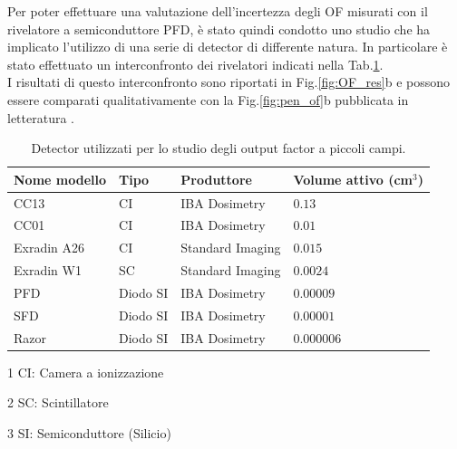 Per poter effettuare una valutazione dell'incertezza degli OF misurati con il rivelatore a semiconduttore PFD, è stato quindi condotto uno studio che ha implicato l'utilizzo di una serie di detector di differente natura. In particolare è stato effettuato un interconfronto dei rivelatori indicati nella Tab.\ref{tab:OF_inter}.\\ I risultati di questo interconfronto sono riportati in Fig.\ref{fig:OF_res}b e possono essere comparati qualitativamente con la Fig.\ref{fig:pen_of}b pubblicata in letteratura \cite{Das2008}.
\begin{table}
\centering
{}
\begin{threeparttable}
\begin{tabular}{llll}
\toprule
Nome modello & Tipo & Produttore & Volume attivo (cm$^3$)\\
\midrule
CC13 & CI\tnote{1} & IBA Dosimetry & $0.13$\\
CC01 & CI & IBA Dosimetry & $0.01$\\
Exradin A26 & CI & Standard Imaging & $0.015$ \\
Exradin W1 & SC\tnote{2} & Standard Imaging & $0.0024$ \\
PFD & Diodo SI\tnote{3} & IBA Dosimetry & $0.00009$ \\
SFD & Diodo SI & IBA Dosimetry & $0.00001$ \\
Razor & Diodo SI & IBA Dosimetry & $0.000006$ \\
\bottomrule
\end{tabular}
\begin{tablenotes}[para]
\item[1] CI: Camera a ionizzazione
\item[2] SC: Scintillatore
\item[3] SI: Semiconduttore (Silicio)
\end{tablenotes}
\end{threeparttable}
\caption{Detector utilizzati per lo studio degli output factor a piccoli campi.}
\label{tab:OF_inter}
\end{table}

